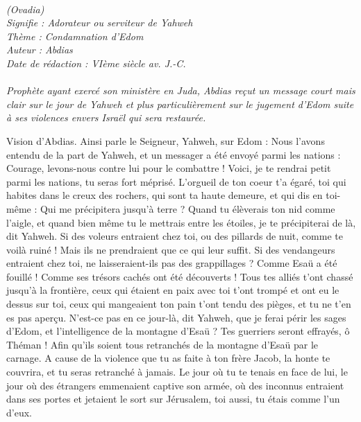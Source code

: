 \BFont
\noindent\hrulefill
\textit{
\bigskip
{\centering{}
\\(Ovadia)
\\Signifie : Adorateur ou serviteur de Yahweh
\\Thème : Condamnation d'Edom
\\Auteur : Abdias
\\Date de rédaction : VIème siècle av. J.-C.\\}
}
\textit{
\\Prophète ayant exercé son ministère en Juda, Abdias reçut un message court mais clair sur le jour de Yahweh et plus particulièrement sur le jugement d’Edom suite à ses violences envers Israël qui sera restaurée.\bigskip
}
\par\nobreak\noindent\hrulefill
\begin{multicols}{2}
\VerseOne{}Vision d'Abdias. Ainsi parle le Seigneur, Yahweh, sur Edom : Nous l’avons entendu de la part de Yahweh, et un messager a été envoyé parmi les nations : Courage, levons-nous contre lui pour le combattre !
Voici, je te rendrai petit parmi les nations, tu seras fort méprisé.
L'orgueil de ton coeur t'a égaré, toi qui habites dans le creux des rochers, qui sont ta haute demeure, et qui dis en toi-même : Qui me précipitera jusqu’à terre ?
Quand tu élèverais ton nid comme l'aigle, et quand bien même tu le mettrais entre les étoiles, je te précipiterai de là, dit Yahweh.
Si des voleurs entraient chez toi, ou des pillards de nuit, comme te voilà ruiné ! Mais ils ne prendraient que ce qui leur suffit. Si des vendangeurs entraient chez toi, ne laisseraient-ils pas des grappillages ?
Comme Esaü a été fouillé ! Comme ses trésors cachés ont été découverts !
Tous tes alliés t'ont chassé jusqu'à la frontière, ceux qui étaient en paix avec toi t'ont trompé et ont eu le dessus sur toi, ceux qui mangeaient ton pain t'ont tendu des pièges, et tu ne t’en es pas aperçu.
N’est-ce pas en ce jour-là, dit Yahweh, que je ferai périr les sages d'Edom, et l’intelligence de la montagne d'Esaü ?
Tes guerriers seront effrayés, ô Théman ! Afin qu’ils soient tous retranchés de la montagne d'Esaü par le carnage.
A cause de la violence que tu as faite à ton frère Jacob, la honte te couvrira, et tu seras retranché à jamais.
Le jour où tu te tenais en face de lui, le jour où des étrangers emmenaient captive son armée, où des inconnus entraient dans ses portes et jetaient le sort sur Jérusalem, toi aussi, tu étais comme l'un d'eux.

\end{multicols}
